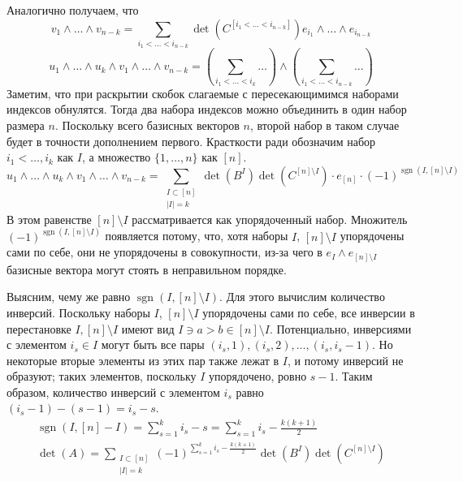 \documentclass{article}
\theoremstyle{definition}
\theoremstyle{remark}
\DeclareMathOperator{\sgn}{sgn}
\begin{document}
Аналогично получаем, что
\begin{equation*}
    v_1 \wedge \hdots \wedge v_{n-k} = \sum_{i_1 < \hdots < i_{n-k}} \det(C^{[i_1 < \hdots < i_{n-k}]}) e_{i_1} \wedge \hdots \wedge e_{i_{n-k}}
\end{equation*}
\begin{equation*}
    u_1 \wedge \hdots \wedge u_k \wedge v_1 \wedge \hdots \wedge v_{n-k} = \left( \sum_{i_1 < \hdots < i_k} \hdots \right) \wedge \left( \sum_{i_1 < \hdots < i_{n-k}} \hdots \right)
\end{equation*}
Заметим, что при раскрытии скобок слагаемые с пересекающимимся наборами индексов обнулятся. Тогда два набора индексов можно объединить в один набор размера $n$. Поскольку всего базисных векторов $n$, второй набор в таком случае будет в точности дополнением первого. Красткости ради обозначим набор $i_1 < \hdots , i_k$ как $I$, а множество $\{1, \hdots, n\}$ как $[n]$.
\begin{equation*}
	u_1 \wedge \hdots \wedge u_k \wedge v_1 \wedge \hdots \wedge v_{n-k} = \sum_{\substack{I \subset [n] \\ |I| = k}} \det(B^I) \det(C^{[n] \setminus I}) \cdot e_{[n]} \cdot (-1)^{\sgn(I, [n] \setminus I)}
\end{equation*}
В этом равенстве $[n] \setminus I$ рассматривается как упорядоченный набор. Множитель $(-1)^{\sgn(I, [n] \setminus I)}$ появляется потому, что, хотя наборы $I$, $[n] \setminus I$ упорядочены сами по себе, они не упорядочены в совокупности, из-за чего в $e_I \wedge e_{[n] \setminus I}$ базисные вектора могут стоять в неправильном порядке.

Выясним, чему же равно $\sgn(I, [n] \setminus I)$. Для этого вычислим количество инверсий. Поскольку наборы $I$, $[n] \setminus I$ упорядочены сами по себе, все инверсии в перестановке $I, [n] \setminus I$ имеют вид $I \ni a > b \in [n] \setminus I$. Потенциально, инверсиями с элементом $i_s \in I$ могут быть все пары $(i_s, 1), (i_s, 2), \hdots, (i_s, i_s - 1)$. Но некоторые вторые элементы из этих пар также лежат в $I$, и потому инверсий не образуют; таких элементов, поскольку $I$ упорядочено, ровно $s - 1$. Таким образом, количество инверсий с элементом $i_s$ равно $(i_s - 1) - (s - 1) = i_s - s$.
\begin{gather*}
    \sgn(I, [n] - I) = \sum_{s = 1}^{k} i_s - s = \sum_{s = 1}^{k} i_s - \frac{k(k+1)}{2} \\
    \det(A) = \sum_{\substack{I \subset [n] \\ |I| = k}} (-1)^{\sum_{s = 1}^{k} i_s - \frac{k(k+1)}{2}} \det(B^I) \det(C^{[n] \setminus I})
\end{gather*}
\end{document}
